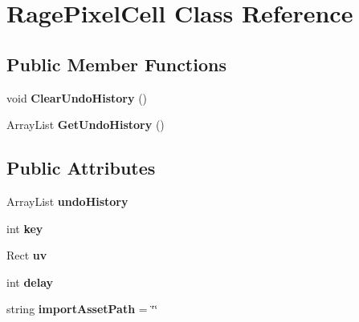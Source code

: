 \hypertarget{class_rage_pixel_cell}{\section{Rage\-Pixel\-Cell Class Reference}
\label{class_rage_pixel_cell}
}
\subsection*{Public Member Functions}
\begin{DoxyCompactItemize}
\item 
\hypertarget{class_rage_pixel_cell_a033c25e8ece9145657733b2d85f1c971}{void {\bfseries Clear\-Undo\-History} ()}\label{class_rage_pixel_cell_a033c25e8ece9145657733b2d85f1c971}

\item 
\hypertarget{class_rage_pixel_cell_ae970d9dde17dd874f51eaa132969fe61}{Array\-List {\bfseries Get\-Undo\-History} ()}\label{class_rage_pixel_cell_ae970d9dde17dd874f51eaa132969fe61}

\end{DoxyCompactItemize}
\subsection*{Public Attributes}
\begin{DoxyCompactItemize}
\item 
\hypertarget{class_rage_pixel_cell_a969905c914c47aac527f158118700f7d}{Array\-List {\bfseries undo\-History}}\label{class_rage_pixel_cell_a969905c914c47aac527f158118700f7d}

\item 
\hypertarget{class_rage_pixel_cell_a276c0bdf7c155d84fb2ce5b16d2f8c5e}{int {\bfseries key}}\label{class_rage_pixel_cell_a276c0bdf7c155d84fb2ce5b16d2f8c5e}

\item 
\hypertarget{class_rage_pixel_cell_af31a44cf09be1bd7780d89074044cfc5}{Rect {\bfseries uv}}\label{class_rage_pixel_cell_af31a44cf09be1bd7780d89074044cfc5}

\item 
\hypertarget{class_rage_pixel_cell_ad53f19eb2242bed2057669c3de676178}{int {\bfseries delay}}\label{class_rage_pixel_cell_ad53f19eb2242bed2057669c3de676178}

\item 
\hypertarget{class_rage_pixel_cell_a21284840098aec45984562cf551c2f56}{string {\bfseries import\-Asset\-Path} = \char`\"{}\char`\"{}}\label{class_rage_pixel_cell_a21284840098aec45984562cf551c2f56}

\end{DoxyCompactItemize}


